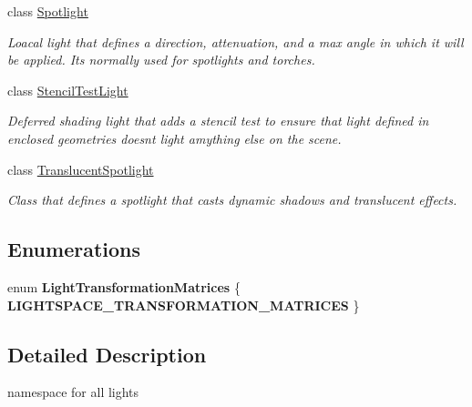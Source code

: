 \begin{DoxyCompactItemize}
class \mbox{\hyperlink{class_geometry_engine_1_1_geometry_world_item_1_1_geometry_light_1_1_spotlight}{Spotlight}}
\begin{DoxyCompactList}\small\item\em Loacal light that defines a direction, attenuation, and a max angle in which it will be applied. It\textquotesingle{}s normally used for spotlights and torches. \end{DoxyCompactList}\item 
class \mbox{\hyperlink{class_geometry_engine_1_1_geometry_world_item_1_1_geometry_light_1_1_stencil_test_light}{Stencil\+Test\+Light}}
\begin{DoxyCompactList}\small\item\em Deferred shading light that adds a stencil test to ensure that light defined in enclosed geometries doesn\textquotesingle{}t light amything else on the scene. \end{DoxyCompactList}\item 
class \mbox{\hyperlink{class_geometry_engine_1_1_geometry_world_item_1_1_geometry_light_1_1_translucent_spotlight}{Translucent\+Spotlight}}
\begin{DoxyCompactList}\small\item\em Class that defines a spotlight that casts dynamic shadows and translucent effects. \end{DoxyCompactList}\end{DoxyCompactItemize}
\subsection*{Enumerations}
\begin{DoxyCompactItemize}
\item 
\mbox{\label{namespace_geometry_engine_1_1_geometry_world_item_1_1_geometry_light_a6b1cd7e70f354c31b5ce908a6772e4ec}} 
enum {\bfseries Light\+Transformation\+Matrices} \{ {\bfseries L\+I\+G\+H\+T\+S\+P\+A\+C\+E\+\_\+\+T\+R\+A\+N\+S\+F\+O\+R\+M\+A\+T\+I\+O\+N\+\_\+\+M\+A\+T\+R\+I\+C\+ES}
 \}
\end{DoxyCompactItemize}


\subsection{Detailed Description}
namespace for all lights 